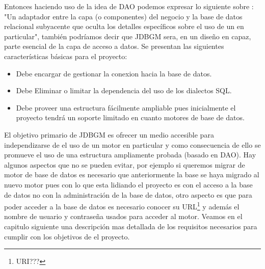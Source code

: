 Entonces haciendo uso de la idea de DAO podemos expresar lo siguiente sobre \jj: "Un adaptador entre la capa (o componentes) del negocio y la base de datos relacional subyacente que oculta los detalles específicos sobre el uso de un \dd en particular", también podríamos decir que JDBGM sera, en un diseño en capaz, parte esencial de la capa de acceso a datos. Se presentan las siguientes características básicas para el proyecto:
\begin{itemize}
\item Debe encargar de gestionar la conexion hacia la base de datos.
\item Debe Eliminar o limitar la dependencia del uso de los dialectos SQL.
\item Debe proveer una estructura fácilmente ampliable pues inicialmente el proyecto tendrá un soporte limitado en cuanto motores de base de datos.
\end{itemize}
El objetivo primario de JDBGM es ofrecer un medio accesible para independizarse de el uso de un motor en particular y como consecuencia de ello se promueve el uso de una estructura ampliamente probada (basado en DAO). Hay algunos aspectos que no se pueden evitar, por ejemplo si queremos migrar de motor de base de datos es necesario que anteriormente la base se haya migrado al nuevo motor pues con lo que esta lidiando el proyecto es con el acceso a la base de datos no con la administración de la base de datos, otro aspecto es que para poder acceder a la base de datos es necesario conocer su URL\footnote{URI???} y además el nombre de usuario y contraseña usados para acceder al motor. Veamos en el capitulo siguiente una descripción mas detallada de los requisitos necesarios para cumplir con los objetivos de el proyecto. 